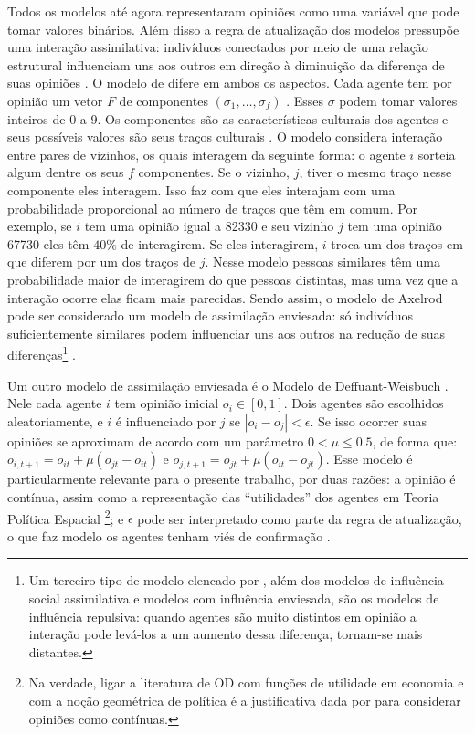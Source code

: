   
  Todos os modelos até agora representaram opiniões como uma variável que pode
  tomar valores binários. Além disso a regra de atualização dos modelos
  pressupõe uma interação assimilativa: indivíduos conectados por meio de uma
  relação estrutural influenciam uns aos outros em direção à diminuição da
  diferença de suas opiniões \cite{flache2017}. O modelo de
   difere em ambos os aspectos. Cada agente
  tem por opinião um vetor $F$ de componentes $(\sigma_1 , \ldots, \sigma_f)$
  \cite{klemm2003role}. Esses $\sigma$ podem tomar valores inteiros de 0 a 9. Os
  componentes são as características culturais dos agentes e seus possíveis
  valores são seus traços culturais \cite{gomes2014}. O modelo considera
  interação entre pares de vizinhos, os quais interagem da seguinte forma: o
  agente \(i\) sorteia algum dentre os seus \(f\) componentes. Se o vizinho,
  \(j\), tiver o mesmo traço nesse componente eles interagem. Isso faz com que
  eles interajam com uma probabilidade proporcional ao número de traços que têm
  em comum. Por exemplo, se \(i\) tem uma opinião igual a 82330 e seu vizinho
  \(j\) tem uma opinião 67730 eles têm \(40 \%\) de interagirem. Se eles
  interagirem, \(i\) troca um dos traços em que diferem por um dos traços de
  \(j\)\cite{axelrod1997dissemination}. Nesse modelo pessoas similares têm uma
  probabilidade maior de interagirem do que pessoas distintas, mas uma vez que a
  interação ocorre elas ficam mais parecidas. Sendo assim, o modelo de Axelrod
  pode ser considerado um modelo de assimilação enviesada: só indivíduos
  suficientemente similares podem influenciar uns aos outros na redução de suas
  diferenças\footnote{Um terceiro tipo de modelo elencado por
    , além dos modelos de influência social assimilativa
    e modelos com influência enviesada, são os modelos de influência repulsiva:
    quando agentes são muito distintos em opinião a interação pode levá-los a um
    aumento dessa diferença, tornam-se mais distantes.}
  \cite{flache2017}.

  Um outro modelo de assimilação enviesada é o Modelo de Deffuant-Weisbuch
  \cite{deffuant2000mixing}. Nele cada agente \(i\) tem opinião inicial \( o_i \in
  [0,1]\). Dois agentes são escolhidos aleatoriamente, e \(i\) é influenciado
  por \(j\) se \(| o_i - o_j| < \epsilon\). Se isso ocorrer suas opiniões se aproximam
  de acordo com um parâmetro $0 < \mu \leq 0.5$, de forma que: $o_{i,t+1} = o_{it} +
  \mu(o_{jt} - o_{it})$ e  $o_{j,t+1} = o_{jt} +
  \mu(o_{it} - o_{jt})$. Esse modelo é particularmente relevante para o presente
  trabalho, por duas razões: a opinião é contínua, assim como a representação
  das ``utilidades'' dos agentes em Teoria Política Espacial \footnote{Na
    verdade, ligar a literatura de OD com funções de utilidade em economia e com
    a noção geométrica de política é a justificativa dada por
     para considerar opiniões como contínuas.}; e
  \(\epsilon\) pode ser interpretado como parte da regra de atualização, o que faz
  modelo os agentes tenham viés de confirmação \cite{flache2017}.

